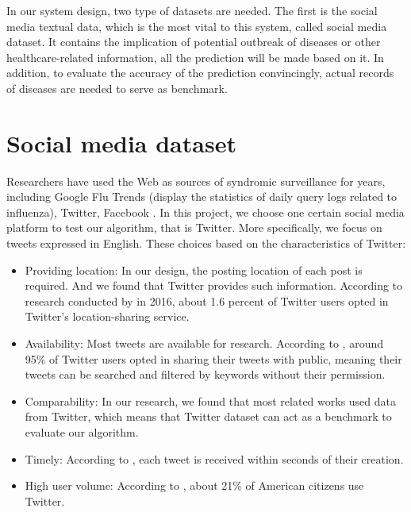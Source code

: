 In our system design, two type of datasets are needed. The first is the social media textual data, which is the most vital to this system, called social media dataset. It contains the implication of potential outbreak of diseases or other healthcare-related information, all the prediction will be made based on it. In addition, to evaluate the accuracy of the prediction convincingly, actual records of diseases are needed to serve as benchmark. 
\section{Social media dataset}
\label{sec:Social media dataset}
Researchers have used the Web as sources of  syndromic surveillance for years, including Google Flu Trends (display the statistics of daily query logs related to influenza), Twitter, Facebook \cite{paul2011you}. 
In this project, we choose one certain social media platform to test our algorithm, that is Twitter. More specifically, we focus on tweets expressed in English. These choices based on the characteristics of Twitter:
\begin{itemize}
    \item Providing location: In our design, the posting location of each post is required. And we found that Twitter provides such information. According to research conducted by \cite{greenwood2016social} in 2016, about 1.6 percent of Twitter users opted in Twitter's location-sharing service.
    \item Availability: Most tweets are available for research. According to \cite{serban2019real}, around 95\% of Twitter users opted in sharing their tweets with public, meaning their tweets can be searched and filtered by keywords without their permission.  
    \item Comparability: In our research, we found that most related works used data from Twitter, which means that Twitter dataset can act as a benchmark to evaluate our algorithm.
    \item Timely: According to \cite{serban2019real}, each tweet is received within seconds of their creation.
    \item High user volume: According to \cite{greenwood2016social}, about 21\% of American citizens use Twitter.
\end{itemize} 

